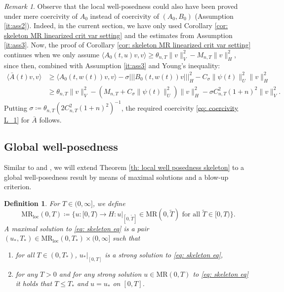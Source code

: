 \documentclass{amsart}
\renewcommand{\MR}{\mathrm{MR}}
\newcommand{\<}{\langle}
\newcommand{\?}{\rangle}
\newcommand{\nn}{|\!|\!|}
\theoremstyle{plain}
\theoremstyle{remark}
\newtheorem{remark}[theorem]{Remark}
\theoremstyle{plain}
\newtheorem{definition}[theorem]{Definition}
\numberwithin{equation}{section}
\begin{document}
\begin{remark}
Observe that the local well-posedness could also have been proved under mere coercivity of $A_0$ instead of coercivity of $(A_0,B_0)$ (Assumption \ref{it:ass2}). Indeed, in the current section, we have only used Corollary \ref{cor: skeleton MR linearized crit var setting} and the estimates from Assumption \ref{it:ass3}. Now, the proof of Corollary \ref{cor: skeleton MR linearized crit var setting} continues when we only assume $\<A_0(t,u)v,v\?\geq \theta_{n,T}\|v\|_V^2-M_{n,T}\|v\|_H^2$,
  since then, combined with Assumption \ref{it:ass3} and Young's inequality:
      \begin{align*}
    \<\bar{A}(t)v,v\?&\geq \<A_0(t,w(t))v,v\?-\sigma\nn B_0(t,w(t))v \nn_H^2-C_\sigma\|\psi(t)\|_U^2\|v\|_H^2\\
    &\geq \theta_{n,T}\|v\|_V^2-({M}_{n,T}+C_\sigma\|\psi(t)\|_U^2)\|v\|_H^2-\sigma C_{n,T}^2(1+n)^2\|v\|_V^2.
  \end{align*}
  Putting $\sigma\coloneqq \theta_{n,T}(2C_{n,T}^2(1+n)^2)^{-1}$, the required coercivity \eqref{eq: coercivity L_1} for $\bar{A}$ follows.
\end{remark}




\subsection{Global well-posedness}

Similar to \cite[Chap. 5]{pruss16} and \cite[\S 18.2]{HNVWvolume3}, we will extend Theorem \ref{th: local well posedness skeleton} to a global well-posedness result by means of maximal solutions and a blow-up criterion.

\begin{definition}\label{def: maximal solution}
For $T\in(0,\infty]$, we define
\[
\MR_{\mathrm{loc}}(0,T)\coloneqq \{u\colon [0,T)\to H: u|_{[0,\tilde{T}]}\in\MR(0,\tilde{T}) \text{ for all } \tilde{T}\in[0,T)\}.
\]
A \emph{maximal solution} to \eqref{eq: skeleton eq} is a pair $(u_*,T_*)\in \MR_{\mathrm{loc}}(0,T_*) \times (0,\infty]$  such that
\begin{enumerate}[label=(\roman*)]
  \item for all $T\in(0,T_*)$, $u_*|_{[0,T]}$ is a strong solution to \eqref{eq: skeleton eq},
  \item for any $T>0$ and for any strong solution $u\in\MR(0,T)$ to \eqref{eq: skeleton eq} it holds that $T\leq T_*$ and $u=u_*$ on $[0,T]$.
\end{enumerate}
\end{definition}
\end{document}
